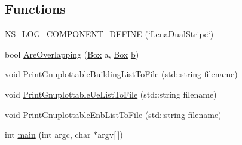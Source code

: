 \subsection*{Functions}
\begin{DoxyCompactItemize}
\item 
\hyperlink{lena-dual-stripe_8cc_ae53df14d9a1785871ce53dc85ba600e9}{N\+S\+\_\+\+L\+O\+G\+\_\+\+C\+O\+M\+P\+O\+N\+E\+N\+T\+\_\+\+D\+E\+F\+I\+NE} (\char`\"{}Lena\+Dual\+Stripe\char`\"{})
\item 
bool \hyperlink{lena-dual-stripe_8cc_a1afb216dd9cb3e096360a211c59259dd}{Are\+Overlapping} (\hyperlink{classns3_1_1Box}{Box} a, \hyperlink{classns3_1_1Box}{Box} \hyperlink{lte__pathloss_8m_a21ad0bd836b90d08f4cf640b4c298e7c}{b})
\item 
void \hyperlink{lena-dual-stripe_8cc_aa3ac76c624e240e8ea6e415ff2289b4b}{Print\+Gnuplottable\+Building\+List\+To\+File} (std\+::string filename)
\item 
void \hyperlink{lena-dual-stripe_8cc_ad818a3dd4c090b8ecaba926e5272c409}{Print\+Gnuplottable\+Ue\+List\+To\+File} (std\+::string filename)
\item 
void \hyperlink{lena-dual-stripe_8cc_a7e3aa5272ba032faa7717e0f3ba2f73d}{Print\+Gnuplottable\+Enb\+List\+To\+File} (std\+::string filename)
\item 
int \hyperlink{lena-dual-stripe_8cc_a0ddf1224851353fc92bfbff6f499fa97}{main} (int argc, char $\ast$argv\mbox{[}$\,$\mbox{]})
\end{DoxyCompactItemize}
